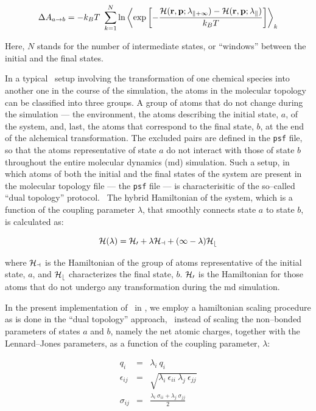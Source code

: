 \begin{equation}
\Delta A_{a \rightarrow b} = -k_B T \ \sum_{k = 1}^N \ln
\left< \exp\left[-\frac{\cal H({\bf r}, {\bf p}; \lambda_{k+1}) - 
                         \cal H({\bf r}, {\bf p}; \lambda_k)}
                        {k_B T}\right]
\right>_k
\end{equation}

Here, $N$ stands for the number of intermediate states, or ``windows''
between the initial and the final states.


In a typical \FEP\ setup involving the transformation
of one chemical species into another one in the course 
of the simulation, the atoms in the molecular topology can be 
classified into three groups. A group of atoms that do not change 
during the simulation --- \eg the environment,  
the atoms describing the initial state, $a$, of the system, and, last, the 
atoms that correspond to the final state, $b$, at the end of the 
alchemical transformation. 
The excluded pairs are defined in the {\tt psf} file, so that 
the atoms representative of state $a$
do not interact with those of state $b$ throughout the 
entire molecular dynamics ({\sc md}) simulation. 
Such a setup, in which atoms of both the initial and the
final states of the system are present in the molecular topology file --- \ie 
the {\tt psf} file --- is characterisitic of the so--called ``dual topology'' 
protocol.~\cite{Axelsen.98}
The hybrid Hamiltonian of the system, which is a function of the
coupling parameter $\lambda$, that smoothly connects state $a$
to state $b$, is calculated as:

\begin{equation}
\cal H(\lambda) = \cal H_0 + \lambda \cal H_a + (1-\lambda) \cal H_b
\end{equation}

where $\cal H_a$ is the Hamiltonian of the group of atoms representative
of the initial state, $a$, and $\cal H_b$ characterizes the final state,
$b$. 
$\cal H_0$ is the Hamiltonian for those atoms that do not undergo any 
transformation during the {\sc md} simulation.


In the present implementation of \FEP\ in \NAMD, we employ a hamiltonian
scaling procedure as is done in the ``dual topology''
approach,~\cite{Pearlman.93} \ie instead 
of scaling the non--bonded parameters of states $a$ and $b$, 
namely the net atomic charges, together with the Lennard--Jones parameters, 
as a function of the coupling parameter, $\lambda$:

\begin{eqnarray}
\nonumber
q_i &=& \lambda_i \ q_i \\[0.4cm]
\epsilon_{ij} &=& \sqrt{\lambda_i \ \epsilon_{ii} \ \lambda_j \ \epsilon_{jj}} \\[0.4cm]
\nonumber
\sigma_{ij} &=& \frac{\lambda_i \ \sigma_{ii} + \lambda_j \ \sigma_{jj}}{2} 
\end{eqnarray}


